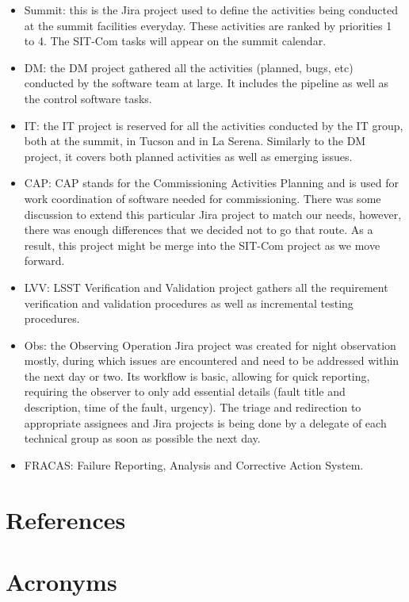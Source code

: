 \documentclass[SE,authoryear,toc]{lsstdoc}
\begin{document}
\begin{itemize}
\item Summit: this is the Jira project used to define the activities being conducted at the summit facilities everyday. These activities are ranked by priorities 1 to 4.  The SIT-Com tasks will appear on the summit calendar.
\item DM: the DM project gathered all the activities (planned, bugs, etc) conducted by the software team at large. It includes the pipeline as well as the control software tasks. 
\item IT: the IT project is reserved for all the activities conducted by the IT group, both at the summit, in Tucson and in La Serena. Similarly to the DM project, it covers both planned activities as well as emerging issues. 
\item CAP: CAP stands for the Commissioning Activities Planning and is used for work coordination of software needed for commissioning. There was some discussion to extend this particular Jira project to match our needs, however, there was enough differences that we decided not to go that route. As a result, this project might be merge into the SIT-Com project as we move forward.  
\item LVV: LSST Verification and Validation project gathers all the requirement verification and validation procedures as well as incremental testing procedures.
\item Obs: the Observing Operation Jira project was created for night observation mostly, during which issues are encountered and need to be addressed within the next day or two. Its workflow is basic, allowing for quick reporting, requiring the observer to only add essential details (fault title and description, time of the fault, urgency). The triage and redirection to appropriate assignees and Jira projects is being done by a delegate of each technical group as soon as possible the next day.
\item FRACAS: Failure Reporting, Analysis and Corrective Action System. 
\end{itemize}


\appendix
\section{References} \label{sec:bib}
%
  
\section{Acronyms} \label{sec:acronyms}

\end{document}
